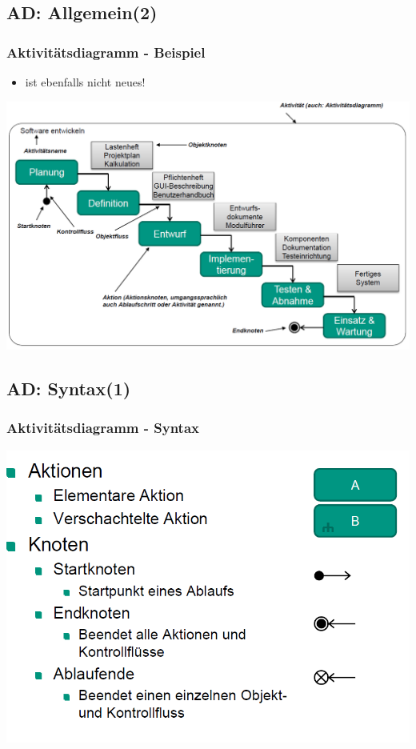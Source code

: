 \documentclass[18pt]{beamer}
\begin{document}
	\subsection{AD: Allgemein(2)}
	\begin{frame}
		\frametitle{Aktivitätsdiagramm - Beispiel}
		\begin{itemize}
			\item ist ebenfalls nicht neues!
		\end{itemize}
		\centering
		\includegraphics[scale=0.35]{./pics/tut2/act_wat.png}
	\end{frame}

	\subsection{AD: Syntax(1)}
	\begin{frame}
		\frametitle{Aktivitätsdiagramm - Syntax}
		\includegraphics[scale=0.45]{./pics/tut2/act_syn1.png}
	\end{frame}
\end{document}
